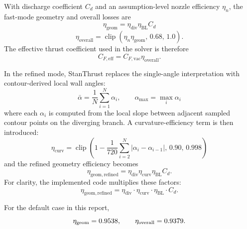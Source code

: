 \documentclass[11pt]{article}
\newcommand{\clip}{\operatorname{clip}}
\begin{document}
With discharge coefficient $C_d$ and an assumption-level nozzle efficiency $\eta_n$, the fast-mode geometry and overall losses are
\begin{equation}
\eta_{\text{geom}}=\eta_{\text{div}}\eta_{\text{BL}}C_d
\label{eq:geom-eff}
\end{equation}
\begin{equation}
\eta_{\text{overall}}=\clip(\eta_n\eta_{\text{geom}},\,0.68,\,1.0).
\label{eq:overall-eff}
\end{equation}
The effective thrust coefficient used in the solver is therefore
\begin{equation}
C_{F,\text{eff}}=C_{F,\text{vac}}\eta_{\text{overall}}.
\label{eq:cf-eff}
\end{equation}

In the refined mode, StanThrust replaces the single-angle interpretation with contour-derived local wall angles:
\begin{equation}
\bar{\alpha} = \frac{1}{N}\sum_{i=1}^{N}\alpha_i,
\qquad
\alpha_{\max}=\max_i \alpha_i
\label{eq:contour-angles}
\end{equation}
where each $\alpha_i$ is computed from the local slope between adjacent sampled contour points on the diverging branch. A curvature-efficiency term is then introduced:
\begin{equation}
\eta_{\mathrm{curv}}
=
\clip\!\left(
1-\frac{1}{720}\sum_{i=2}^{N}\left|\alpha_i-\alpha_{i-1}\right|,
\,
0.90,
\,
0.998
\right)
\label{eq:curvature-efficiency}
\end{equation}
and the refined geometry efficiency becomes
\begin{equation}
\eta_{\mathrm{geom,refined}}
=
\eta_{\text{div}}
\eta_{\mathrm{curv}}
\eta_{\text{BL}}
C_d.
\label{eq:geom-eff-refined}
\end{equation}
For clarity, the implemented code multiplies these factors:
\begin{equation}
\eta_{\mathrm{geom,refined}}=
\eta_{\text{div}}
\cdot
\eta_{\mathrm{curv}}
\cdot
\eta_{\text{BL}}
\cdot
C_d.
\label{eq:geom-eff-refined-product}
\end{equation}

For the default case in this report,
\[
\eta_{\text{geom}}=0.9538,
\qquad
\eta_{\text{overall}}=0.9379.
\]
\end{document}
